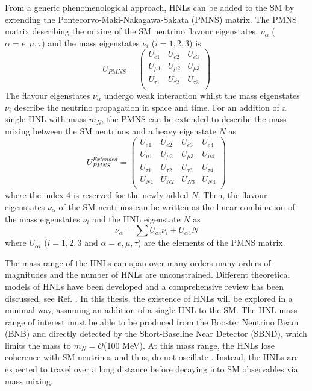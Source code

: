 From a generic phenomenological approach, HNLs can be added to the SM by extending the Pontecorvo-Maki-Nakagawa-Sakata (PMNS) matrix.
The PMNS matrix describing the mixing of the SM neutrino flavour eigenstates, $\nu_{\alpha}$ ($\alpha=e,\mu,\tau$) and the mass eigenstates $\nu_{i}$ ($i=1,2,3$) is
\begin{equation}
	U_{PMNS} =
	\begin{pmatrix}
		U_{e1} & U_{e2} & U_{e3}\\
		U_{\mu1} & U_{\mu2} & U_{\mu3}\\
		U_{\tau1} & U_{\tau2} & U_{\tau3}\\
	\end{pmatrix}
\end{equation}
The flavour eigenstates $\nu_{\alpha}$ undergo weak interaction whilst the mass eigenstates $\nu_{i}$ describe the neutrino propagation in space and time.
For an addition of a single HNL with mass $m_{N}$, the PMNS can be extended to describe the mass mixing between the SM neutrinos and a heavy eigenstate $N$ as 
\begin{equation}
	U_{PMNS}^{Extended} =
	\begin{pmatrix}
		U_{e1} & U_{e2} & U_{e3} & U_{e4}\\
		U_{\mu1} & U_{\mu2} & U_{\mu3} & U_{\mu4}\\
		U_{\tau1} & U_{\tau2} & U_{\tau3} & U_{\tau4}\\
		U_{N1} & U_{N2} & U_{N3} & U_{N4}\\
	\end{pmatrix}
\end{equation}
where the index 4 is reserved for the newly added $N$.
Then, the flavour eigenstates  $\nu_{\alpha}$ of the SM neutrinos can be written as the linear combination of the mass eigenstates $\nu_{i}$ and the HNL eigenstate $N$ as  
\begin{equation}
	\nu_{\alpha}=\sum U_{\alpha i}\nu_{i} + U_{\alpha 4}N
\end{equation}
where $U_{\alpha i }$ ($i=1,2,3$ and $\alpha=e,\mu,\tau$) are the elements of the PMNS matrix.

The mass range of the HNLs can span over many orders many orders of magnitudes and the number of HNLs are unconstrained.
Different theoretical models of HNLs have been developed and a comprehensive review has been discussed, see Ref. \cite{}. 
In this thesis, the existence of HNLs will be explored in a minimal way, assuming an addition of a single HNL to the SM.  
The HNL mass range of interest must be able to be produced from the Booster Neutrino Beam (BNB) and directly detected by the Short-Baseline Near Detector (SBND), which limits the mass to $m_{N}=\mathcal{O}$(100 MeV).
At this mass range, the HNLs lose coherence with SM neutrinos and thus, do not oscillate \cite{}.
Instead, the HNLs are expected to travel over a long distance before decaying into SM observables via mass mixing.


